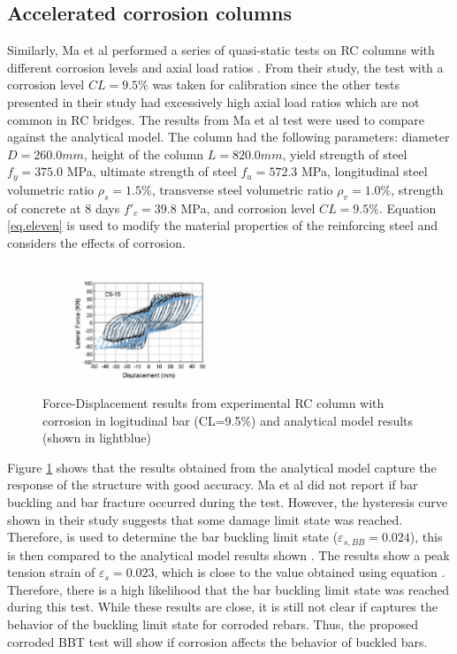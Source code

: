 \subsection{Accelerated corrosion columns}
Similarly, Ma et al performed a series of quasi-static tests on RC columns with different corrosion levels and axial load ratios \cite{Ma2012}. From their study, the test with a corrosion level $CL=9.5\%$ was taken for calibration since the other tests presented in their study had excessively high axial load ratios which are not common in RC bridges. The results from Ma et al test	\cite{Ma2012} were used to compare against the analytical model. The column had the following parameters: diameter $D = 260.0 mm$, height of the column $L = 820.0 mm$, yield strength of steel $f_{y} = 375.0$ MPa, ultimate strength of steel $f_{u} = 572.3$ MPa, longitudinal steel volumetric ratio $\rho_{s} = 1.5\% $, transverse steel volumetric ratio $\rho_{v} = 1.0\% $, strength of concrete at 8 days $f'_{c} = 39.8$ MPa, and corrosion level $CL=9.5\%$. Equation \ref{eq.eleven} is used to modify the material properties of the reinforcing steel and considers the effects of corrosion. 

\begin{figure}[htbp]
	\centering
	\includegraphics[width=0.60\textwidth]{Chapter-5/figs/Model_vs_MaEtAl_220218.pdf}
	\caption{Force-Displacement results from experimental RC column with corrosion in logitudinal bar (CL=9.5\%) \cite{Ma2012} and analytical model results (shown in lightblue)}
	\label{fig:ModelCalibration_Corrosion}
\end{figure}

Figure \ref{fig:ModelCalibration_Corrosion} shows that the results obtained from the analytical model capture the response of the structure with good accuracy. Ma et al \cite{Ma2012} did not report if bar buckling and bar fracture occurred during the test. However, the hysteresis curve shown in their study suggests that some damage limit state was reached. Therefore,  is used to determine the bar buckling limit state ($\varepsilon_{s,BB}=0.024$), this is then compared to the analytical model results shown . The results show a peak tension strain of $\varepsilon_{s}=0.023$, which is close to the value obtained using equation . Therefore, there is a high likelihood that the bar buckling limit state was reached during this test. While these results are close, it is still not clear if  captures the behavior of the buckling limit state for corroded rebars. Thus, the proposed corroded BBT test will show if corrosion affects the behavior of buckled bars.

